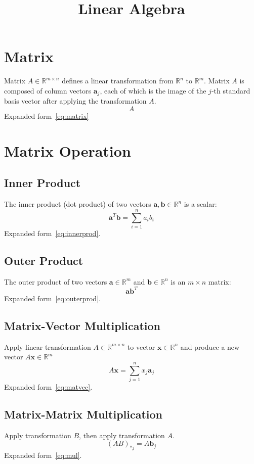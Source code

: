 \documentclass{article}
\title{Linear Algebra}
\date{}
\begin{document}
\maketitle

\tableofcontents

\newpage
\section{Matrix}
Matrix $A \in \mathbb{R}^{m \times n}$ defines a linear transformation from $\mathbb{R}^n$ to $\mathbb{R}^m$.
\newline
Matrix $A$ is composed of column vectors $\mathbf{a}_j$, each of which is the image of the $j$-th standard basis vector after applying the transformation $A$.
\[
    A
\]
Expanded form~\ref{eq:matrix}


\newpage
\section{Matrix Operation}


\subsection{Inner Product}
The inner product (dot product) of two vectors $\mathbf{a}, \mathbf{b} \in \mathbb{R}^n$ is a scalar:
\[
    \mathbf{a}^T \mathbf{b} = \sum_{i=1}^n a_i b_i
\]
Expanded form~\ref{eq:innerprod}.

\subsection{Outer Product}
The outer product of two vectors $\mathbf{a} \in \mathbb{R}^m$ and $\mathbf{b} \in \mathbb{R}^n$ is an $m \times n$ matrix:
\[
    \mathbf{a} \mathbf{b}^T
\]
Expanded form~\ref{eq:outerprod}.

\subsection{Matrix-Vector Multiplication}
Apply linear transformation $A \in \mathbb{R}^{m \times n}$ to vector $\mathbf{x} \in \mathbb{R}^n$ and produce a new vector $A\mathbf{x} \in \mathbb{R}^m$
\[
    A\mathbf{x} = \sum_{j=1}^n x_j \mathbf{a}_j
\]{
Expanded} form~\ref{eq:matvec}.

\subsection{Matrix-Matrix Multiplication}
Apply transformation $B$, then apply transformation $A$.
\[
    (AB)_{*j} = A\mathbf{b}_j
\]
Expanded form~\ref{eq:mul}.
\end{document}
